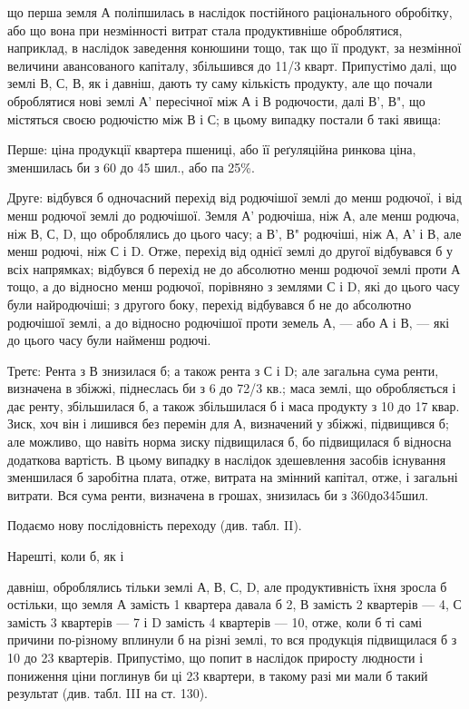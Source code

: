 \parcont{}  %
що перша земля А поліпшилась в наслідок постійного раціонального обробітку,
або що вона при незмінності витрат стала продуктивніше оброблятися,
наприклад, в наслідок заведення конюшини тощо, так що її продукт, за незмінної
величини авансованого капіталу, збільшився до 11/3 кварт. Припустімо
далі, що землі В, С, В, як і давніш, дають ту саму кількість продукту, але що
почали оброблятися нові землі А' пересічної між А і В родючости, далі В', В", що
містяться своєю родючістю між В і С; в цьому випадку постали б такі явища:

Перше: ціна продукції квартера пшениці, або її реґуляційна ринкова
ціна, зменшилась би з 60 до 45 шил., або па 25\%.

Друге: відбувся б одночасний перехід від родючішої землі до менш
родючої, і від менш родючої землі до родючішої. Земля А' родючіша, ніж А, але
менш родюча, ніж В, С, D, що оброблялись до цього часу; а В', В" родючіші, ніж
А, А' і В, але менш родючі, ніж С і D. Отже, перехід від однієї землі до другої
відбувався б у всіх напрямках; відбувся б перехід не до абсолютно
менш родючої землі проти А тощо, а до відносно менш родючої, порівняно
з землями С і D, які до цього часу були найродючіші; з другого боку, перехід
відбувався б не до абсолютно родючішої землі, а до відносно родючішої проти
земель А, — або А і В, — які до цього часу були найменш родючі.

Третє: Рента з В знизилася б; а також рента з С і D; але загальна
сума ренти, визначена в збіжжі, піднеслась би з 6 до 72/3 кв.; маса землі, що
обробляється і дає ренту, збільшилася б, а також збільшилася б і маса продукту
з 10 до 17 квар. Зиск, хоч він і лишився без перемін для А, визначений у
збіжжі, підвищився б; але можливо, що навіть норма зиску підвищилася б, бо
підвищилася б відносна додаткова вартість. В цьому випадку в наслідок здешевлення
засобів
існування
зменшилася б
заробітна плата,
отже, витрата
на змінний
капітал,
отже, і загальні
витрати. Вся
сума ренти,
визначена в
грошах, знизилась
би з
360до345шил.

Подаємо
нову послідовність
переходу
(див. табл. II).

Нарешті,
коли б, як і

давніш, оброблялись тільки землі А, В, С, D, але продуктивність їхня зросла б
остільки, що земля А замість 1 квартера давала б 2, В замість 2 квартерів — 4,
С замість 3 квартерів — 7 і D замість 4 квартерів — 10, отже, коли б ті самі
причини по-різному вплинули б на різні землі, то вся продукція підвищилася
б з 10 до 23 квартерів. Припустімо, що попит в наслідок приросту
людности і пониження ціни поглинув би ці 23 квартери, в такому разі ми
мали б такий результат (див. табл. III на ст. 130).

